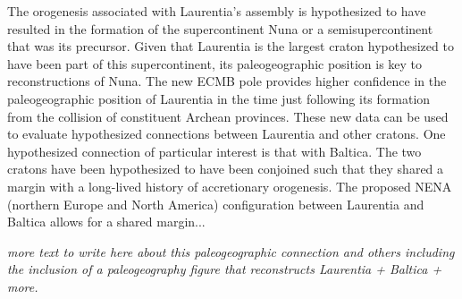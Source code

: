 \documentclass[draft]{agujournal2019}
\begin{document}

The orogenesis associated with Laurentia's assembly is hypothesized to have resulted in the formation of the supercontinent Nuna or a semisupercontinent that was its precursor. Given that Laurentia is the largest craton hypothesized to have been part of this supercontinent, its paleogeographic position is key to reconstructions of Nuna. The new ECMB pole provides higher confidence in the paleogeographic position of Laurentia in the time just following its formation from the collision of constituent Archean provinces. These new data can be used to evaluate hypothesized connections between Laurentia and other cratons. One hypothesized connection of particular interest is that with Baltica. The two cratons have been hypothesized to have been conjoined such that they shared a margin with a long-lived history of accretionary orogenesis. The proposed NENA (northern Europe and North America) configuration between Laurentia and Baltica allows for a shared margin...

\textit{more text to write here about this paleogeographic connection and others including the inclusion of a paleogeography figure that reconstructs Laurentia + Baltica + more.}
\end{document}
